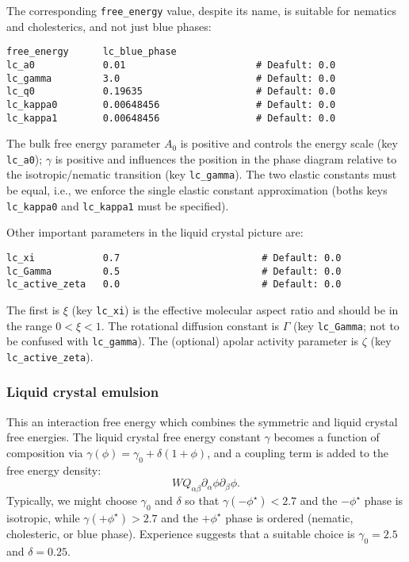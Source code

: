 The corresponding \texttt{free\_energy} value, despite its name, is
suitable for nematics and cholesterics, and not just blue phases:
\begin{lstlisting}
free_energy      lc_blue_phase
lc_a0            0.01                       # Deafult: 0.0
lc_gamma         3.0                        # Default: 0.0
lc_q0            0.19635                    # Default: 0.0
lc_kappa0        0.00648456                 # Default: 0.0
lc_kappa1        0.00648456                 # Default: 0.0
\end{lstlisting}
The bulk free energy parameter $A_0$ is positive and controls the
energy scale (key \texttt{lc\_a0}); $\gamma$ is positive and
influences the position in the phase diagram relative to the
isotropic/nematic transition (key \texttt{lc\_gamma}).
The two elastic constants must be equal, i.e., we enforce the
single elastic constant approximation (boths keys \texttt{lc\_kappa0} and
\texttt{lc\_kappa1} must be specified).

Other important parameters in the liquid crystal picture are:
\begin{lstlisting}
lc_xi            0.7                         # Default: 0.0
lc_Gamma         0.5                         # Default: 0.0
lc_active_zeta   0.0                         # Default: 0.0
\end{lstlisting}
The first is $\xi$ (key \texttt{lc\_xi}) is the effective molecular
aspect ratio and should be in the range $0< \xi< 1$. The rotational
diffusion constant is $\Gamma$ (key \texttt{lc\_Gamma}; not to be
confused with \texttt{lc\_gamma}). The (optional) apolar activity
parameter is $\zeta$ (key \texttt{lc\_active\_zeta}).



\subsubsection{Liquid crystal emulsion}
\label{input-liquid-crystal-emulsion}

This an interaction free energy which combines the symmetric and liquid
crystal free energies. The liquid crystal free energy constant $\gamma$
becomes a
function of composition via $\gamma(\phi) = \gamma_0 + \delta(1 + \phi)$,
and a coupling term is added to the free energy density:
\[
WQ_{\alpha\beta} \partial_\alpha \phi \partial_\beta \phi.
\]
Typically, we might choose $\gamma_0$ and $\delta$ so that
$\gamma(-\phi^\star) < 2.7$ and the $-\phi^\star$ phase is isotropic,
while $\gamma(+\phi^\star) > 2.7$ and the
$+\phi^\star$ phase is ordered (nematic, cholesteric, or blue phase).
Experience suggests that a suitable choice is $\gamma_0 = 2.5$ and
$\delta = 0.25$.

